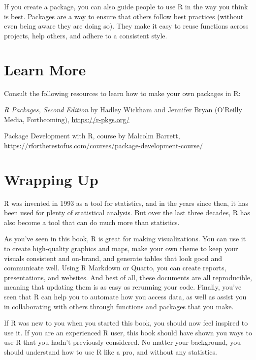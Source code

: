 \documentclass[
]{book}
\begin{document}
If you create a package, you can also guide people to use R in the way you think is best. Packages are a way to ensure that others follow best practices (without even being aware they are doing so). They make it easy to reuse functions across projects, help others, and adhere to a consistent style.

\hypertarget{learn-more-10}{%
\section*{Learn More}\label{learn-more-10}}

Consult the following resources to learn how to make your own packages in R:

\emph{R Packages, Second Edition} by Hadley Wickham and Jennifer Bryan (O'Reilly Media, Forthcoming), \url{https://r-pkgs.org/}

Package Development with R, course by Malcolm Barrett, \url{https://rfortherestofus.com/courses/package-development-course/}

\hypertarget{wrapping-up}{%
\section*{Wrapping Up}\label{wrapping-up}}

R was invented in 1993 as a tool for statistics, and in the years since then, it has been used for plenty of statistical analysis. But over the last three decades, R has also become a tool that can do much more than statistics.

As you've seen in this book, R is great for making visualizations. You can use it to create high-quality graphics and maps, make your own theme to keep your visuals consistent and on-brand, and generate tables that look good and communicate well. Using R Markdown or Quarto, you can create reports, presentations, and websites. And best of all, these documents are all reproducible, meaning that updating them is as easy as rerunning your code. Finally, you've seen that R can help you to automate how you access data, as well as assist you in collaborating with others through functions and packages that you make.

If R was new to you when you started this book, you should now feel inspired to use it. If you are an experienced R user, this book should have shown you ways to use R that you hadn't previously considered. No matter your background, you should understand how to use R like a pro, and without any statistics.
\end{document}
